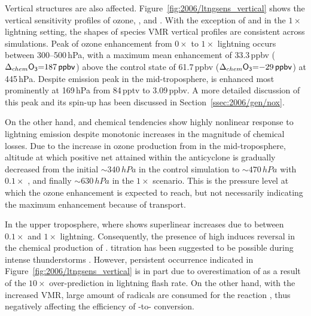 Vertical structures are also affected. Figure~\ref{fig:2006/ltngsens_vertical} shows the vertical sensitivity profiles of ozone,
, and . With the exception of  and  in the $1\times$ lightning setting, the
shapes of species VMR vertical profiles are consistent across simulations. Peak of ozone enhancement from
$0\times$ to $1\times$ lightning occurs between 300--500\,\unit{hPa}, with a maximum mean  enhancement
of 33.3\,\unit{ppbv} ($\Delta_{chem}\chem{O_3}=187\,\unit{ppbv}$) above the control state of 61.7\,\unit{ppbv}
($\Delta_{chem}\chem{O_3}=-29\,\unit{ppbv}$) at 445\,\unit{hPa}. Despite emission peak in the mid-troposphere,
 is enhanced most prominently at 169\,\unit{hPa} from 84\,\unit{pptv} to 3.09\,\unit{ppbv}. A more detailed
discussion of this peak and its spin-up has been discussed in Section~\ref{ssec:2006/gen/nox}.

On the other hand,  and  chemical tendencies show highly nonlinear response to lightning emission
despite monotonic increases in the magnitude of  chemical losses. Due to the increase in ozone production
from {\lnox} in the mid-troposphere, altitude at which positive net  attained within the anticyclone is gradually
decreased from the initial $\sim340\,\unit{hPa} $ in the control simulation to $\sim470\,\unit{hPa}$ with $0.1\times$ {\lnox},
and finally $\sim630\,\unit{hPa}$ in the $1\times$ scenario. This is the pressure level at which the ozone enhancement
is expected to reach, but not necessarily indicating the maximum enhancement because of transport.

In the upper troposphere, where  shows superlinear increases due to {\lnox} between $0.1\times$
and $1\times$ lightning. Consequently, the presence of high  induces reversal in the chemical production
of .  titration has been suggested to be possible during intense thunderstorms \citep[e.g.][]{Cummings:2013vn}.
However, persistent occurrence indicated in Figure~\ref{fig:2006/ltngsens_vertical} is in part due to overestimation of
 as a result of the $10\times$ over-prediction in lightning flash rate. On the other hand, with the increased
 VMR, large amount of  radicals are consumed for the reaction ,
thus negatively affecting the efficiency of -to- conversion.


